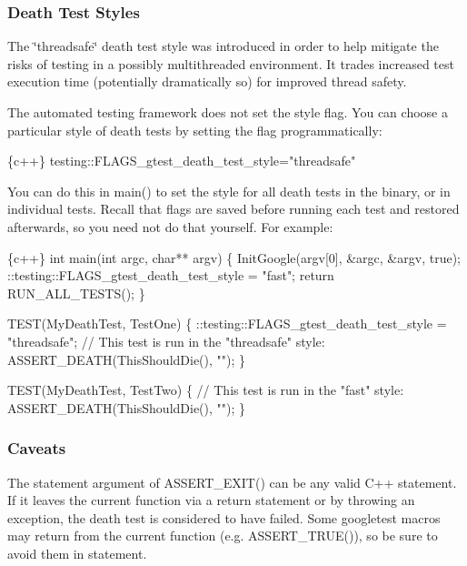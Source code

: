 \subsubsection*{Death Test Styles}

The \char`\"{}threadsafe\char`\"{} death test style was introduced in order to help mitigate the risks of testing in a possibly multithreaded environment. It trades increased test execution time (potentially dramatically so) for improved thread safety.

The automated testing framework does not set the style flag. You can choose a particular style of death tests by setting the flag programmatically\+:


\begin{DoxyCode}
\{c++\}
testing::FLAGS\_gtest\_death\_test\_style="threadsafe"
\end{DoxyCode}


You can do this in {\ttfamily main()} to set the style for all death tests in the binary, or in individual tests. Recall that flags are saved before running each test and restored afterwards, so you need not do that yourself. For example\+:


\begin{DoxyCode}
\{c++\}
int main(int argc, char** argv) \{
  InitGoogle(argv[0], &argc, &argv, true);
  ::testing::FLAGS\_gtest\_death\_test\_style = "fast";
  return RUN\_ALL\_TESTS();
\}

TEST(MyDeathTest, TestOne) \{
  ::testing::FLAGS\_gtest\_death\_test\_style = "threadsafe";
  // This test is run in the "threadsafe" style:
  ASSERT\_DEATH(ThisShouldDie(), "");
\}

TEST(MyDeathTest, TestTwo) \{
  // This test is run in the "fast" style:
  ASSERT\_DEATH(ThisShouldDie(), "");
\}
\end{DoxyCode}


\subsubsection*{Caveats}

The {\ttfamily statement} argument of {\ttfamily A\+S\+S\+E\+R\+T\+\_\+\+E\+X\+I\+T()} can be any valid C++ statement. If it leaves the current function via a {\ttfamily return} statement or by throwing an exception, the death test is considered to have failed. Some googletest macros may return from the current function (e.\+g. {\ttfamily A\+S\+S\+E\+R\+T\+\_\+\+T\+R\+U\+E()}), so be sure to avoid them in {\ttfamily statement}.


